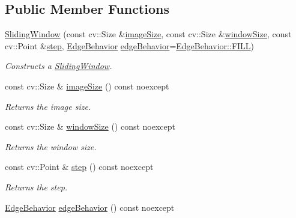 \subsection*{Public Member Functions}
\begin{DoxyCompactItemize}
\item 
\hyperlink{group___imagery_module_gaac77ef4c080960674fcf6c0c25960a1d}{Sliding\+Window} (const cv\+::\+Size \&\hyperlink{group___imagery_module_ga2771aea9a69cec6529758e6315bf2088}{image\+Size}, const cv\+::\+Size \&\hyperlink{group___imagery_module_ga7d3254b7d65021c7f0464c2424479de1}{window\+Size}, const cv\+::\+Point \&\hyperlink{group___imagery_module_gaa5f0a9213abf71efe1d51e6da9fc0163}{step}, \hyperlink{group___imagery_module_gaf813556adc6cfc1daa1ee410d7c84a17}{Edge\+Behavior} \hyperlink{group___imagery_module_ga069cd456276d030f571f59d1f04be74c}{edge\+Behavior}=\hyperlink{namespacedg_1_1deepcore_1_1imagery_gaf813556adc6cfc1daa1ee410d7c84a17ae8225b11842409df543692aebed34fd1}{Edge\+Behavior\+::\+F\+I\+LL})
\begin{DoxyCompactList}\small\item\em Constructs a \hyperlink{classdg_1_1deepcore_1_1imagery_1_1_sliding_window}{Sliding\+Window}. \end{DoxyCompactList}\item 
const cv\+::\+Size \& \hyperlink{group___imagery_module_ga2771aea9a69cec6529758e6315bf2088}{image\+Size} () const noexcept
\begin{DoxyCompactList}\small\item\em Returns the image size. \end{DoxyCompactList}\item 
const cv\+::\+Size \& \hyperlink{group___imagery_module_ga7d3254b7d65021c7f0464c2424479de1}{window\+Size} () const noexcept
\begin{DoxyCompactList}\small\item\em Returns the window size. \end{DoxyCompactList}\item 
const cv\+::\+Point \& \hyperlink{group___imagery_module_gaa5f0a9213abf71efe1d51e6da9fc0163}{step} () const noexcept
\begin{DoxyCompactList}\small\item\em Returns the step. \end{DoxyCompactList}\item 
\hyperlink{group___imagery_module_gaf813556adc6cfc1daa1ee410d7c84a17}{Edge\+Behavior} \hyperlink{group___imagery_module_ga069cd456276d030f571f59d1f04be74c}{edge\+Behavior} () const noexcept

\end{DoxyCompactItemize}
